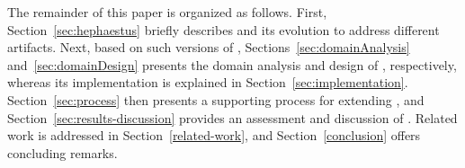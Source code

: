 
The remainder of this paper is organized as follows. First, Section~\ref{sec:hephaestus} briefly describes \hp{} and its evolution to address different artifacts. Next, based on such versions of \hp, Sections~\ref{sec:domainAnalysis} and~\ref{sec:domainDesign} presents the domain analysis and design of \hpl, respectively, whereas its implementation is explained in Section~\ref{sec:implementation}. Section~\ref{sec:process} then presents a supporting process for extending \hpl, and  Section~\ref{sec:results-discussion} provides an assessment and discussion of \hpl. Related work is addressed in Section~\ref{related-work}, and Section~\ref{conclusion} offers concluding remarks.


